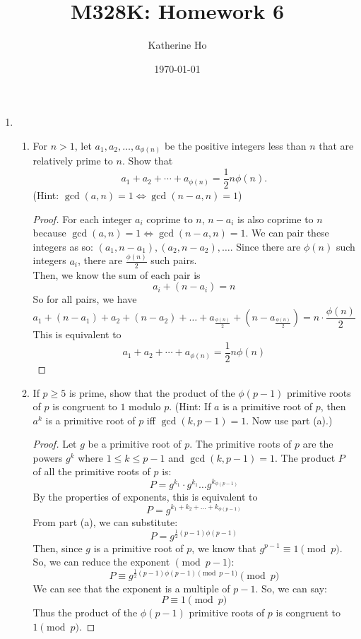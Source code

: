 \documentclass[11pt]{article}
\title{M328K: Homework 6}
\author{Katherine Ho}
\date\today
\theoremstyle{definition}
\begin{document}
\maketitle

\begin{enumerate}
    \item 
    \begin{enumerate}
        \item For $n>1$, let $a_1, a_2,\dots, a_{\phi(n)}$ be the positive integers less than $n$ that are relatively prime to $n$. Show that $$a_1 + a_2+\cdots + a_{\phi(n)} = \frac{1}{2} n\phi(n).$$ (Hint: $\gcd(a,n)=1 \iff \gcd(n-a,n)=1$)
        \begin{proof}
            For each integer $a_i$ coprime to $n$, $n-a_i$ is also coprime to $n$ because
            $\gcd(a,n)=1 \iff \gcd(n-a,n)=1$. We can pair these integers as so:
            $(a_1,n-a_1),(a_2, n-a_2),\dots$.
            Since there are $\phi(n)$ such integers $a_i$, there are $\frac{\phi(n)}{2}$ such pairs. \\
            Then, we know the sum of each pair is 
            \[ a_i + (n-a_i) = n \]
            So for all pairs, we have
            \[
                a_1 + (n-a_1) + a_2 + (n-a_2) + \dots + a_{\frac{\phi(n)}{2}} + (n-a_{\frac{\phi(n)}{2}}) = n\cdot \frac{\phi(n)}{2}
            \]
            This is equivalent to 
            \[
                a_1 + a_2+\cdots + a_{\phi(n)} = \frac{1}{2} n\phi(n)
            \]
        \end{proof}
        
        \item If $p\geq 5$ is prime, show that the product of the $\phi(p-1)$ primitive roots of $p$ is congruent to $1$ modulo $p$. (Hint: If $a$ is a primitive root of $p$, then $a^k$ is a primitive root of $p$ iff $\gcd(k,p-1) = 1$. Now use part (a).)
        \begin{proof}
            Let $g$ be a primitive root of $p$. The primitive roots of $p$ are the powers $g^k$
            where $1\le k\le p-1$ and $\gcd(k,p-1) = 1$. 
            The product $P$ of all the primitive roots of $p$ is: 
            \[ 
                P = g^{k_1}\cdot g^{k_1}\dots g^{k_{\phi(p-1)}}
            \]
            By the properties of exponents, this is equivalent to 
            \[
                P = g^{k_1+k_2+\dots+k_{\phi(p-1)}}
            \]
            From part (a), we can substitute:
            \[
                P = g^{\frac{1}{2}(p-1)\phi(p-1)}
            \]
            Then, since $g$ is a primitive root of $p$, we know that $g^{p-1}\equiv 1\pmod{p}$. 
            So, we can reduce the exponent $\pmod{p-1}$:
            \[
                P \equiv g^{\frac{1}{2}(p-1)\phi(p-1)\pmod{p-1}}\pmod{p}
            \]
            We can see that the exponent is a multiple of $p-1$. So, we can say:
            \[ 
                P\equiv 1\pmod{p}
            \]
            Thus the product of the $\phi(p-1)$ primitive roots of $p$ is congruent to $1\pmod{p}$.
        \end{proof}
    \end{enumerate}
    

\end{enumerate}
\end{document}
